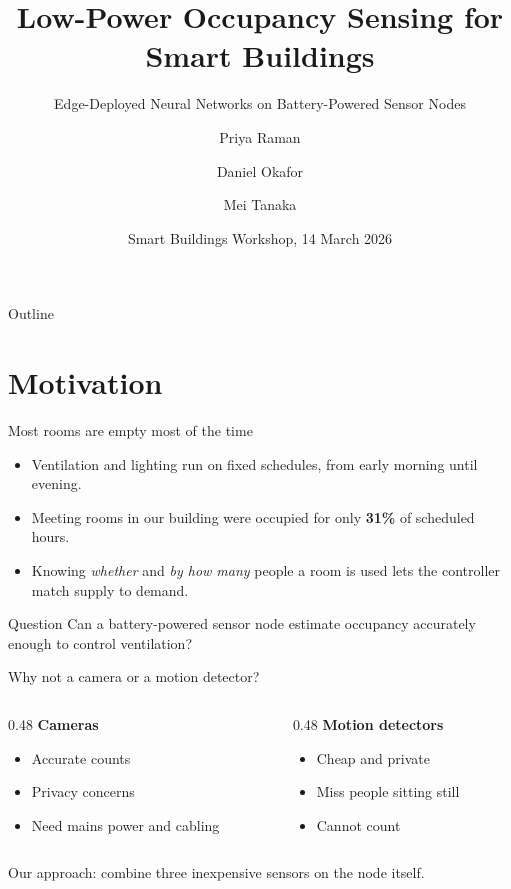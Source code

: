 \documentclass[aspectratio=169,11pt]{beamer}
\title[Occupancy Sensing at the Edge]{Low-Power Occupancy Sensing for Smart Buildings}
\subtitle{Edge-Deployed Neural Networks on Battery-Powered Sensor Nodes}
\author[P. Raman]{Priya Raman \and Daniel Okafor \and Mei Tanaka}
\institute[Northfield]{Northfield Institute of Technology \and Harbour Automation Ltd.}
\date{Smart Buildings Workshop, 14 March 2026}
\begin{document}
\begin{frame}
  \titlepage
\end{frame}

\begin{frame}{Outline}
  \tableofcontents
\end{frame}

\section{Motivation}

\begin{frame}{Most rooms are empty most of the time}
  \begin{itemize}
    \item Ventilation and lighting run on fixed schedules, from early morning until evening.
    \item Meeting rooms in our building were occupied for only \textbf{31\%} of scheduled hours.
    \item Knowing \emph{whether} and \emph{by how many} people a room is used lets the controller match supply to demand.
  \end{itemize}
  \vspace{1em}
  \begin{block}{Question}
    Can a battery-powered sensor node estimate occupancy accurately enough to control ventilation?
  \end{block}
\end{frame}

\begin{frame}{Why not a camera or a motion detector?}
  \begin{columns}[T]
    \begin{column}{0.48\textwidth}
      \textbf{Cameras}
      \begin{itemize}
        \item Accurate counts
        \item Privacy concerns
        \item Need mains power and cabling
      \end{itemize}
    \end{column}
    \begin{column}{0.48\textwidth}
      \textbf{Motion detectors}
      \begin{itemize}
        \item Cheap and private
        \item Miss people sitting still
        \item Cannot count
      \end{itemize}
    \end{column}
  \end{columns}
  \vspace{1.2em}
  \centering
  Our approach: combine three inexpensive sensors \alert{on the node itself}.
\end{frame}
\end{document}
